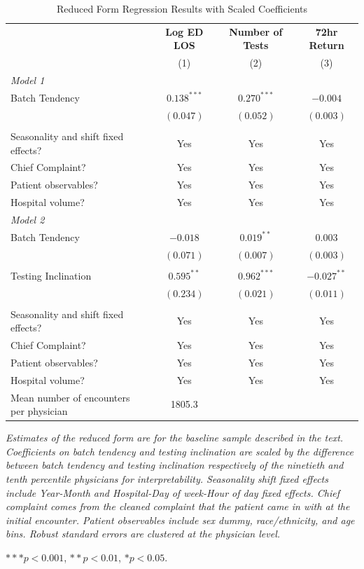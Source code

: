 \documentclass[,,nonblindrev]{informs}
\begin{document}
\begin{table}[htbp]
\centering
\caption{Reduced Form Regression Results with Scaled Coefficients}
\label{tab:reducedform}
\begin{tabular}{p{6cm}ccc}
\toprule
& \multicolumn{1}{c}{\textbf{Log ED LOS}}
& \multicolumn{1}{c}{\textbf{Number of Tests}}
& \multicolumn{1}{c}{\textbf{72hr Return}} \\
& \multicolumn{1}{c}{(1)}
& \multicolumn{1}{c}{(2)}
& \multicolumn{1}{c}{(3)} \\
\midrule
\textit{Model 1} & & & \\
Batch Tendency      & $0.138^{***}$ & $0.270^{***}$ & $-0.004$  \\
                    & $(0.047)$  & $(0.052)$     & $(0.003)$ \\
\\
Seasonality and shift fixed effects? & Yes & Yes & Yes \\
Chief Complaint? & Yes & Yes & Yes \\
Patient observables? & Yes & Yes & Yes \\
Hospital volume? & Yes & Yes & Yes \\
\midrule
\midrule
\textit{Model 2} & & & \\
Batch Tendency      & $-0.018$      & $0.019^{**}$ & $0.003$   \\
                    & $(0.071)$     & $(0.007)$     & $(0.003)$ \\
                    &     &     &  \\
Testing Inclination    & $0.595^{**}$  & $0.962^{***}$ & $-0.027^{**}$ \\
                    & $(0.234)$  & $(0.021)$     & $(0.011)$ \\
\\
Seasonality and shift fixed effects? & Yes & Yes & Yes \\
Chief Complaint? & Yes & Yes & Yes \\
Patient observables? & Yes & Yes & Yes \\
Hospital volume? & Yes & Yes & Yes \\
\midrule
Mean number of encounters per physician & 1805.3 &  &  \\
\midrule
\bottomrule
\end{tabular}
\begin{tablenotes}
\small
\item \textit{Estimates of the reduced form are for the baseline sample described in the text. Coefficients on batch tendency and testing inclination are scaled by the difference between batch tendency and testing inclination respectively of the ninetieth and tenth percentile physicians for interpretability. Seasonality shift fixed effects include Year-Month and Hospital-Day of week-Hour of day fixed effects. Chief complaint comes from the cleaned complaint that the patient came in with at the initial encounter. Patient observables include sex dummy, race/ethnicity, and age bins. Robust standard errors are clustered at the physician level.}
\item $*** p < 0.001$, $** p < 0.01$, $* p < 0.05$.
\end{tablenotes}
\end{table}
\end{document}
